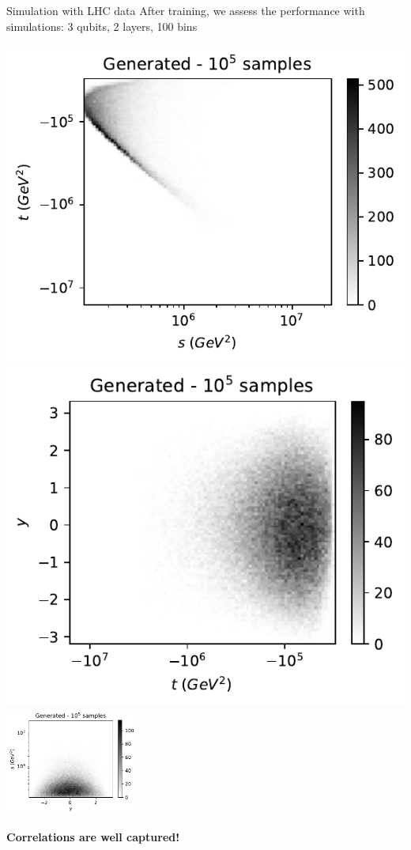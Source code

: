 \documentclass[11pt,aspectratio=169]{beamer}
\begin{document}

\begin{frame}{Simulation with LHC data}
    After training, we assess the performance with simulations: 3 qubits, 2 layers, 100 bins

    \begin{multicols*}{3}
        \includegraphics[width=0.33 \textwidth]{figures/plots/LHCttbar/s-t_FAKE_100k.pdf}
        \includegraphics[width=0.33 \textwidth]{figures/plots/LHCttbar/t-y_FAKE_100k.pdf}
        \includegraphics[width=0.33\textwidth]{figures/plots/LHCttbar/y-s_FAKE_100k.pdf}
    \end{multicols*}
    \begin{center}
        { \color{red}
        \textbf{
        Correlations are well captured!}
        }
    \end{center}
\end{frame}
\end{document}
